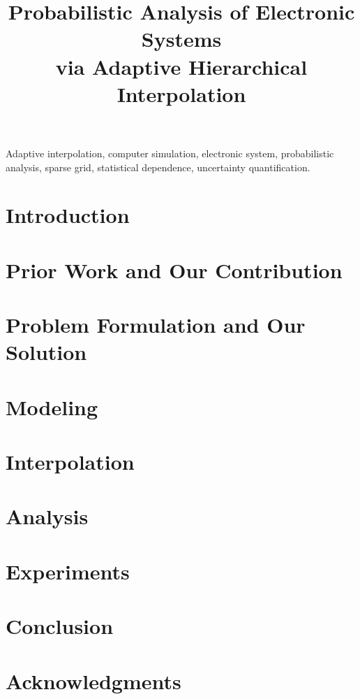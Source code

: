 \documentclass[journal]{IEEEtran}
\title{
  Probabilistic Analysis of Electronic Systems\\
  via Adaptive Hierarchical Interpolation
}
\author{}
\begin{document}
  \maketitle

  \begin{abstract}
    
  \end{abstract}

  \begin{IEEEkeywords}
    Adaptive interpolation,
    computer simulation,
    electronic system,
    probabilistic analysis,
    sparse grid,
    statistical dependence,
    uncertainty quantification.
  \end{IEEEkeywords}


  \section{Introduction} 
  

  \section{Prior Work and Our Contribution} 
  

  \section{Problem Formulation and Our Solution} 
  

  \section{Modeling} 
  

  \section{Interpolation} 
  

  \section{Analysis} 
  

  \section{Experiments} 
  

  \section{Conclusion} 
  

  \section*{Acknowledgments}
  

  \begingroup
    \linespread{0.9}
    
    
  \endgroup

  
\end{document}
